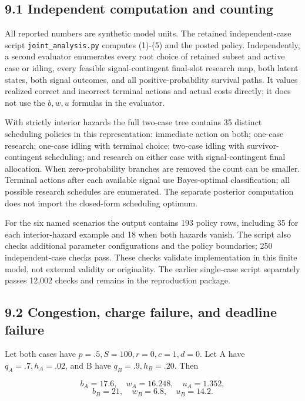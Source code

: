 \documentclass[
  11pt,
]{article}
\begin{document}
\subsection{9.1 Independent computation and
counting}\label{independent-computation-and-counting}

All reported numbers are synthetic model units. The retained
independent-case script \texttt{joint\_analysis.py} computes (1)-(5) and
the posted policy. Independently, a second evaluator enumerates every
root choice of retained subset and active case or idling, every feasible
signal-contingent final-slot research map, both latent states, both
signal outcomes, and all positive-probability survival paths. It values
realized correct and incorrect terminal actions and actual costs
directly; it does not use the \(b,w,u\) formulas in the evaluator.

With strictly interior hazards the full two-case tree contains 35
distinct scheduling policies in this representation: immediate action on
both; one-case research; one-case idling with terminal choice; two-case
idling with survivor-contingent scheduling; and research on either case
with signal-contingent final allocation. When zero-probability branches
are removed the count can be smaller. Terminal actions after each
available signal use Bayes-optimal classification; all possible research
schedules are enumerated. The separate posterior computation does not
import the closed-form scheduling optimum.

For the six named scenarios the output contains 193 policy rows,
including 35 for each interior-hazard example and 18 when both hazards
vanish. The script also checks additional parameter configurations and
the policy boundaries; 250 independent-case checks pass. These checks
validate implementation in this finite model, not external validity or
originality. The earlier single-case script separately passes 12,002
checks and remains in the reproduction package.

\subsection{9.2 Congestion, charge failure, and deadline
failure}\label{congestion-charge-failure-and-deadline-failure}

Let both cases have \(p=.5,S=100,r=0,c=1,d=0\). Let A have
\(q_A=.7,h_A=.02\), and B have \(q_B=.9,h_B=.20\). Then

\[b_A=17.6,\quad w_A=16.248,\quad u_A=1.352,\]
\[b_B=21,\quad w_B=6.8,\quad u_B=14.2.\]
\end{document}
